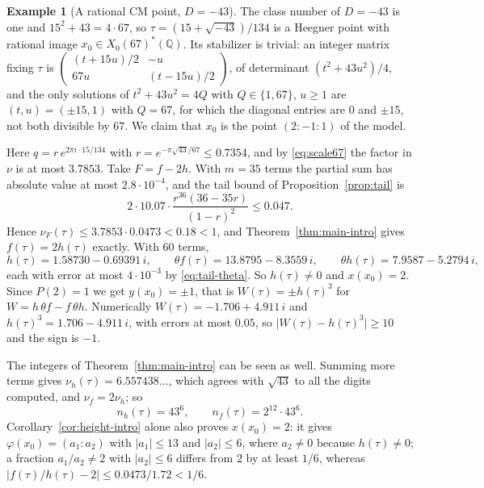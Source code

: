 \documentclass[11pt]{amsart}
\theoremstyle{definition}
\newtheorem{example}[theorem]{Example}
\theoremstyle{remark}
\newcommand{\Q}{\mathbb{Q}}
\newcommand{\smat}[4]{\left(\begin{smallmatrix}#1&#2\\#3&#4\end{smallmatrix}\right)}
\begin{document}
\begin{example}[A rational CM point, $D=-43$]\label{ex:43}
The class number of $D=-43$ is one and $15^2+43=4\cdot67$, so
$\tau=(15+\sqrt{-43})/134$ is a Heegner point with rational image
$x_0\in X_0(67)^*(\Q)$.  Its stabilizer is trivial: an integer matrix fixing $\tau$ is
$\smat{(t+15u)/2}{-u}{67u}{(t-15u)/2}$, of determinant $(t^2+43u^2)/4$, and
the only solutions of $t^2+43u^2=4Q$ with $Q\in\{1,67\}$, $u\ge1$ are
$(t,u)=(\pm15,1)$ with $Q=67$, for which the diagonal entries are $0$ and
$\pm15$, not both divisible by $67$.  We claim that $x_0$ is the point $(2:-1:1)$
of the model.

Here $q=r\,e^{2\pi i\cdot15/134}$ with $r=e^{-\pi\sqrt{43}/67}\le0.7354$, and by
\eqref{eq:scale67} the factor in $\nu$ is at most $3.7853$.  Take $F=f-2h$.
With $m=35$ terms the partial sum has absolute value at most $2.8\cdot10^{-4}$,
and the tail bound of Proposition~\ref{prop:tail} is
\[
2\cdot10.07\cdot\frac{r^{36}(36-35r)}{(1-r)^2}\le0.047 .
\]
Hence $\nu_F(\tau)\le3.7853\cdot0.0473<0.18<1$, and Theorem~\ref{thm:main-intro}
gives $f(\tau)=2h(\tau)$ exactly.  With $60$ terms,
\[
h(\tau)=1.58730-0.69391\,i,\qquad
\theta f(\tau)=13.8795-8.3559\,i,\qquad
\theta h(\tau)=7.9587-5.2794\,i,
\]
each with error at most $4\cdot10^{-3}$ by \eqref{eq:tail-theta}.  So
$h(\tau)\ne0$ and $x(x_0)=2$.  Since $P(2)=1$ we get $y(x_0)=\pm1$, that is
$W(\tau)=\pm h(\tau)^3$ for $W=h\,\theta f-f\,\theta h$.  Numerically
$W(\tau)=-1.706+4.911\,i$ and $h(\tau)^3=1.706-4.911\,i$, with errors at most
$0.05$, so $\lvert W(\tau)-h(\tau)^3\rvert\ge10$ and the sign is $-1$.

The integers of Theorem~\ref{thm:main-intro} can be seen as well.  Summing more
terms gives $\nu_h(\tau)=6.557438\ldots$, which agrees with $\sqrt{43}$ to all
the digits computed, and $\nu_f=2\nu_h$; so
\[
n_h(\tau)=43^6,\qquad n_f(\tau)=2^{12}\cdot43^6 .
\]
Corollary~\ref{cor:height-intro} alone also proves $x(x_0)=2$: it gives
$\varphi(x_0)=(a_1:a_2)$ with $\lvert a_1\rvert\le13$ and $\lvert a_2\rvert\le6$,
where $a_2\ne0$ because $h(\tau)\ne0$; a fraction $a_1/a_2\ne2$ with
$\lvert a_2\rvert\le6$ differs from $2$ by at least $1/6$, whereas
$\lvert f(\tau)/h(\tau)-2\rvert\le0.0473/1.72<1/6$.
\end{example}
\end{document}
